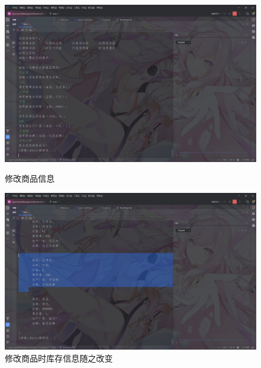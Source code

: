 \documentclass[12pt, a4paper, oneside]{ctexart}
\begin{document}
\begin{figure}[H]
    \begin{minipage}[t]{0.48\textwidth}
        \includegraphics[width=\textwidth]{images/修改商品信息.png}
        \caption*{修改商品信息}
    \end{minipage}
    \hfill
    \begin{minipage}[t]{0.48\textwidth}
        \includegraphics[width=\textwidth]{images/修改商品时库存信息随之改变.png}
        \caption*{修改商品时库存信息随之改变}
    \end{minipage}
\end{figure}
\end{document}
